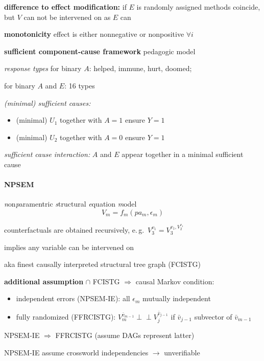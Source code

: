 \documentclass[8pt,twoside]{extarticle}
\newcommand{\indep}{\perp \!\!\! \perp}
\begin{document}
\begin{multicols}{2}
 \textbf{difference to effect modification:} if $E$ is randomly assigned methods coincide, but $V$ can not be intervened on as $E$ can 

 \textbf{monotonicity} effect is either nonnegative or nonpositive $\forall i$

 \textbf{sufficient component-cause framework} pedagogic model

 \textit{response types} for binary $A$: helped, immune, hurt, doomed;

 for binary $A$ and $E$: 16 types

 \textit{(minimal) sufficient causes: }
\begin{itemize}[itemsep=0em, topsep=0pt, partopsep=0pt,parsep=0pt, leftmargin=1.5em]
\setlength{\itemsep}{0pt}%
\setlength{\parskip}{0pt}
\item (minimal) $U_1$ together with $A=1$ ensure $Y=1$
\item (minimal) $U_2$ together with $A=0$ ensure $Y=1$
\end{itemize}
\textit{sufficient cause interaction:} $A$ and $E$ appear together in a minimal sufficient cause


\paragraph{NPSEM} \textit{n}on\textit{p}aramentric \textit{s}tructural \textit{e}quation \textit{m}odel
$$V_m = f_m(pa_m, \epsilon_m)$$

 counterfactuals are obtained recursively, e.\,g.\  $V_3^{v_1} = V_3^{v_1, V_2^{v_1}}$

 implies any variable can be intervened on

 aka finest causally interpreted structural tree graph (FCISTG)

 \textbf{additional assumption} $\cap$ FCISTG $\Rightarrow$ causal Markov condition:
\begin{itemize}[itemsep=0em, topsep=0pt, partopsep=0pt,parsep=0pt, leftmargin=1.5em]
\setlength{\itemsep}{0pt}%
\setlength{\parskip}{0pt}
\item independent errors (NPSEM-IE): all $\epsilon_m$ mutually independent
\item fully randomized (FFRCISTG):  $V_m^{\bar{v}_{m-1}} \indep V_j^{\bar{v}_{j-1}}$ if $\bar{v}_{j-1}$ subvector of $\bar{v}_{m-1}$
\end{itemize}

 NPSEM-IE $\Rightarrow$ FFRCISTG (assume DAGs represent latter)

 NPSEM-IE assume crossworld independencies $\to$ unverifiable



\end{multicols}
\end{document}
